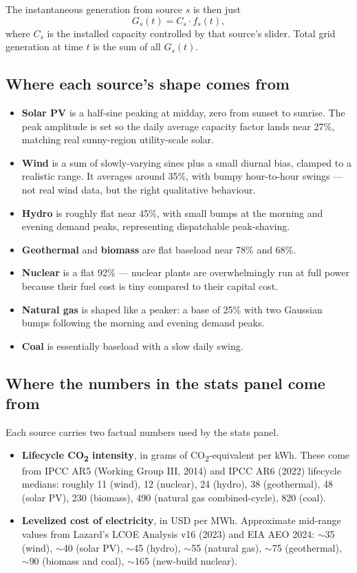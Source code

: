 The instantaneous generation from source $s$ is then just
\[
G_s(t) = C_s \cdot f_s(t),
\]
where $C_s$ is the installed capacity controlled by that source's
slider. Total grid generation at time $t$ is the sum of all $G_s(t)$.

\subsection*{Where each source's shape comes from}

\begin{itemize}
    \item \textbf{Solar PV} is a half-sine peaking at midday, zero
    from sunset to sunrise. The peak amplitude is set so the daily
    average capacity factor lands near 27\%, matching real
    sunny-region utility-scale solar.
    \item \textbf{Wind} is a sum of slowly-varying sines plus a
    small diurnal bias, clamped to a realistic range. It averages
    around 35\%, with bumpy hour-to-hour swings --- not real wind
    data, but the right qualitative behaviour.
    \item \textbf{Hydro} is roughly flat near 45\%, with small bumps
    at the morning and evening demand peaks, representing
    dispatchable peak-shaving.
    \item \textbf{Geothermal} and \textbf{biomass} are flat baseload
    near 78\% and 68\%.
    \item \textbf{Nuclear} is a flat 92\% --- nuclear plants are
    overwhelmingly run at full power because their fuel cost is
    tiny compared to their capital cost.
    \item \textbf{Natural gas} is shaped like a peaker: a base of
    25\% with two Gaussian bumps following the morning and evening
    demand peaks.
    \item \textbf{Coal} is essentially baseload with a slow daily
    swing.
\end{itemize}

\subsection*{Where the numbers in the stats panel come from}

Each source carries two factual numbers used by the stats panel.

\begin{itemize}
    \item \textbf{Lifecycle CO\textsubscript{2} intensity}, in grams
    of CO\textsubscript{2}-equivalent per kWh. These come from IPCC
    AR5 (Working Group III, 2014) and IPCC AR6 (2022) lifecycle
    medians: roughly 11 (wind), 12 (nuclear), 24 (hydro), 38
    (geothermal), 48 (solar PV), 230 (biomass), 490 (natural gas
    combined-cycle), 820 (coal).
    \item \textbf{Levelized cost of electricity}, in USD per MWh.
    Approximate mid-range values from Lazard's LCOE Analysis v16
    (2023) and EIA AEO 2024: $\sim$35 (wind), $\sim$40 (solar PV),
    $\sim$45 (hydro), $\sim$55 (natural gas), $\sim$75
    (geothermal), $\sim$90 (biomass and coal), $\sim$165 (new-build
    nuclear).
\end{itemize}

